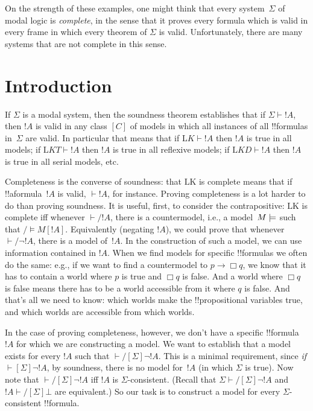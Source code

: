 \documentclass[10pt,a4paper]{article}
\theoremstyle{plain}
\theoremstyle{definition}
\theoremstyle{remark}
\newcommand*{\olfileid}[3]{}
\newcommand*{\olsection}[1]{\section*{#1}}
\providecommand{\lif}{\mathbin{\rightarrow}}
\providecommand{\lfalse}{\bot}
\providecommand{\Proves}{\mathrel{\vdash}}
\providecommand{\mSat}[3]{\ensuremath{#1 \models #2[#3]}}
\providecommand{\mModel}[2]{\ensuremath{#1 \models #2}}
\providecommand{\Log}{\ensuremath{\mathrm{L}}}
\providecommand{\mClass}[1]{[#1]}
\begin{document}
On the strength of these examples, one might think that every
system~$\Sigma$ of modal logic is \emph{complete}, in the sense that
it proves every formula which is valid in every frame in which every
theorem of $\Sigma$ is valid. Unfortunately, there are many systems
that are not complete in this sense.





\olfileid{nml}{com}{int}

\olsection{Introduction}

If $\Sigma$ is a modal system, then the soundness theorem establishes
that if $\Sigma \Proves !A$, then $!A$ is valid in any class
$\mClass{C}$ of models in which all instances of all !!{formula}s
in~$\Sigma$ are valid. In particular that means that if $\Log{K}
\Proves !A$ then $!A$ is true in all models; if $\Log{KT} \Proves !A$
then $!A$ is true in all reflexive models; if $\Log{KD} \Proves !A$
then $!A$ is true in all serial models, etc.

Completeness is the converse of soundness: that \Log{K} is complete
means that if !!a{formula}~$!A$ is valid, $\Proves !A$, for instance.
Proving completeness is a lot harder to do than proving soundness.  It
is useful, first, to consider the contrapositive: \Log{K} is complete
iff whenever $\Proves/ !A$, there is a countermodel, i.e., a
model~$\mModel{M}$ such that $\mSat/{M}{!A}$. Equivalently (negating
$!A$), we could prove that whenever $\Proves/ \lnot !A$, there is a
model of~$!A$.  In the construction of such a model, we can use
information contained in $!A$.  When we find models for specific
!!{formula}s we often do the same: e.g., if we want to find a
countermodel to $p \lif \Box q$, we know that it has to contain a
world where $p$ is true and $\Box q$ is false. And a world where $\Box
q$ is false means there has to be a world accessible from it where $q$
is false. And that's all we need to know: which worlds make the
!!{propositional variable}s true, and which worlds are accessible from
which worlds.

In the case of proving completeness, however, we don't have a specific
!!{formula}~$!A$ for which we are constructing a model. We want to
establish that a model exists for every $!A$ such that
$\Proves/[\Sigma] \lnot !A$. This is a minimal requirement, since
\emph{if} $\Proves[\Sigma] \lnot !A$, by soundness, there is no model
for~$!A$ (in which $\Sigma$ is true).  Now note that $\Proves/[\Sigma]
\lnot !A$ iff $!A$ is $\Sigma$-consistent.  (Recall that $\Sigma
\Proves/[\Sigma] \lnot !A$ and $!A \Proves/[\Sigma] \lfalse$ are
equivalent.)  So our task is to construct a model for every
$\Sigma$-consistent !!{formula}.
\end{document}
